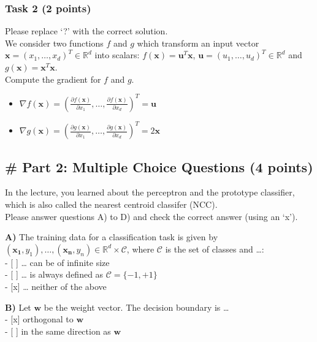 \documentclass[11pt]{article}
\providecommand{\tightlist}{%
      \setlength{\itemsep}{0pt}\setlength{\parskip}{0pt}}
\begin{document}
    \hypertarget{task-2-2-points}{%
\subsubsection{Task 2 (2 points)}\label{task-2-2-points}}

Please replace `?' with the correct solution.\\
We consider two functions \(f\) and \(g\) which transform an input
vector \(\mathbf{x} = (x_1, \dots , x_d)^T \in \mathbb{R}^d\) into
scalars: \(f(\mathbf{x}) = \mathbf{u}^T\mathbf{x}\),
\(\mathbf{u} = (u_1, \dots, u_d)^T \in \mathbb{R}^d\) and
\(g(\mathbf{x}) = \mathbf{x}^T\mathbf{x}\).\\
Compute the gradient for \(f\) and \(g\).

    \begin{itemize}
\tightlist
\item
  \(\nabla f(\mathbf{x}) = (\frac{\partial f(\mathbf{x})}{\partial x_1}, \dots, \frac{\partial f(\mathbf{x})}{\partial x_d})^T =\mathbf{u}\)\\
\item
  \(\nabla g(\mathbf{x}) = (\frac{\partial g(\mathbf{x})}{\partial x_1}, \dots, \frac{\partial g(\mathbf{x})}{\partial x_d})^T =2\mathbf{x}\)
\end{itemize}

    \hypertarget{part-2-multiple-choice-questions-4-points}{%
\subsection{\# Part 2: Multiple Choice Questions (4
points)}\label{part-2-multiple-choice-questions-4-points}}

In the lecture, you learned about the perceptron and the prototype
classifier, which is also called the nearest centroid classifer (NCC).\\
Please answer questions A) to D) and check the correct answer (using an
`x').

    \textbf{A)} The training data for a classification task is given by
\((\mathbf{x_1}, y_1),\ldots, ( \mathbf{x_n}, y_n ) \in \mathbb{R}^d \times \mathcal{C}\),
where \(\mathcal{C}\) is the set of classes and \ldots{}:\\
- {[} {]} \ldots{} can be of infinite size\\
- {[} {]} \ldots{} is always defined as \(\mathcal{C} = \{-1,+1\}\)\\
- {[}x{]} \ldots{} neither of the above

    \textbf{B)} Let \(\mathbf{w}\) be the weight vector. The decision
boundary is \ldots{}\\
- {[}x{]} orthogonal to \(\mathbf{w}\)\\
- {[} {]} in the same direction as \(\mathbf{w}\)
\end{document}
